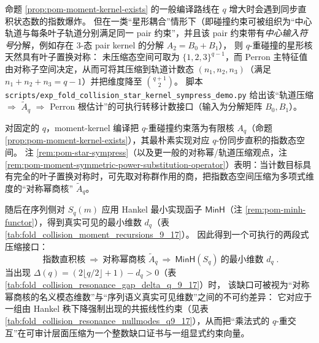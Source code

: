 \begin{remark}\label{rem:pom-star-sympress}
命题 \ref{prop:pom-moment-kernel-exists} 的一般编译路线在 \(q\) 增大时会遇到同步直积状态数的指数爆炸。
但在一类“星形耦合”情形下（即碰撞约束可被组织为“中心轨道与每条叶子轨道分别满足同一 pair 约束”，并且该 pair 约束带有\emph{中心输入符号}分解，例如存在 \(3\)-态 pair kernel 的分解 \(A_2=B_0+B_1\)），
则 \(q\)-重碰撞的星形核天然具有叶子置换对称：
未压缩态空间可取为 \(\{1,2,3\}^{q-1}\)，而 Perron 主特征值由对称子空间决定，从而可将其压缩到轨道计数态
\((n_1,n_2,n_3)\)（满足 \(n_1+n_2+n_3=q-1\)）并把维度降至
\(\binom{q+1}{2}\)。
脚本 \texttt{scripts/exp\_fold\_collision\_star\_kernel\_sympress\_demo.py} 给出该“轨道压缩 \(\Rightarrow\) \(\widetilde A_q\) \(\Rightarrow\) Perron 根估计”的可执行转移计数接口（输入为分解矩阵 \(B_0,B_1\)）。
\end{remark}



\begin{remark}\label{rem:pom-sympower-then-minh}
对固定的 \(q\)，moment-kernel 编译把 \(q\)-重碰撞约束落为有限核 \(A_q\)（命题 \ref{prop:pom-moment-kernel-exists}），其最朴素实现对应 \(q\)-份同步直积的指数态空间。
注 \ref{rem:pom-star-sympress}（以及更一般的对称幂/轨道压缩观点，注 \ref{rem:pom-moment-symmetric-power-substitution-operator}）表明：当计数目标具有完全的叶子置换对称时，可先取对称群作用的商，把指数态空间压缩为多项式维度的“对称幂商核” \(\widetilde A_q\)。
\par
随后在序列侧对 \(S_q(m)\) 应用 Hankel 最小实现函子 \(\mathsf{MinH}\)（注 \ref{rem:pom-minh-functor}），得到真实可见的最小维数 \(d_q\)（表 \ref{tab:fold_collision_moment_recursions_9_17}）。
因此得到一个可执行的两段式压缩接口：
\[
\boxed{\;
\text{指数直积核}\ \Longrightarrow\ \text{对称幂商核 }\widetilde A_q\ \Longrightarrow\ \mathsf{MinH}(S_q)\ \text{的最小维数 }d_q\; }.
\]
当出现 \(\Delta(q)=(2\lfloor q/2\rfloor+1)-d_q>0\)（表 \ref{tab:fold_collision_resonance_gap_delta_q_9_17}）时，
该缺口可被视为“对称幂商核的名义模态维数”与“序列语义真实可见维数”之间的不可约差异：
它对应于一组由 Hankel 秩下降强制出现的共振线性约束（见表 \ref{tab:fold_collision_resonance_nullmodes_q9_17}），从而把“乘法式的 \(q\)-重交互”在可审计层面压缩为一个整数缺口证书与一组显式约束向量。
\end{remark}

